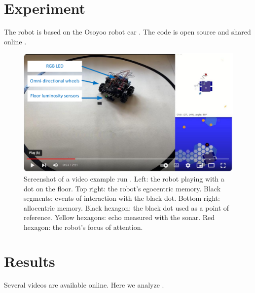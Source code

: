 \documentclass[runningheads]{llncs}
\begin{document}
\section{Experiment}

The robot is based on the Osoyoo robot car \cite{osoyoo_robot_car}.
The code is open source and shared online \cite{petitcat_github}.

\begin{figure}
	\includegraphics[width=\textwidth]{Figure_video.pdf}
	\caption{Screenshot of a video example run \cite{georgeon_petitcat_2024}.
	Left: the robot playing with a dot on the floor.
	Top right: the robot's egocentric memory. Black segments: events of interaction with the black dot. 
	Bottom right: allocentric memory. Black hexagon: the black dot used as a point of reference. Yellow hexagons: echo measured with the sonar. Red hexagon: the robot's focus of attention.} \label{fig:video}
\end{figure}




\section{Results}

Several videos are available online. Here we analyze \cite{georgeon_petitcat_2024}.
\end{document}
